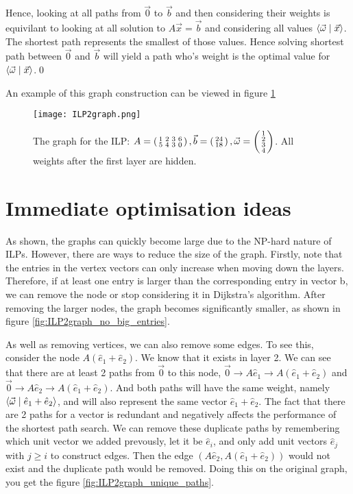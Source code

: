 Hence, looking at all paths from $\vec 0$ to $\vec b$ and then considering their weights is equivilant to looking at all solution to $A\vec x = \vec b$ and considering all values $\langle \vec\omega \mid \vec x \rangle$. The shortest path represents the smallest of those values. Hence solving shortest path between $\vec 0$ and $\vec b$ will yield a path who's weight is the optimal value for $\langle \vec\omega \mid \vec x \rangle$.\qed

An example of this graph construction can be viewed in figure \ref{fig:ILP2graph_no_optimisation}
\begin{figure}
    \texttt{[image: ILP2graph.png]}
    \caption{\label{fig:ILP2graph_no_optimisation}The graph for the ILP: $A = \left(\begin{smallmatrix}1&2&3&6\\5&4&3&0\end{smallmatrix}\right), \vec b = \left(\begin{smallmatrix}24\\18\end{smallmatrix}\right), \vec \omega = \left(\begin{smallmatrix}1\\2\\3\\4\end{smallmatrix}\right)$. All weights after the first layer are hidden.}
\end{figure}

\section{Immediate optimisation ideas}
\label{chap:graph_optimisation}
As shown, the graphs can quickly become large due to the NP-hard nature of ILPs. However, there are ways to reduce the size of the graph. Firstly, note that the entries in the vertex vectors can only increase when moving down the layers. Therefore, if at least one entry is larger than the corresponding entry in vector b, we can remove the node or stop considering it in Dijkstra's algorithm. After removing the larger nodes, the graph becomes significantly smaller, as shown in figure \ref{fig:ILP2graph_no_big_entries}.

As well as removing vertices, we can also remove some edges. To see this, consider the node $A(\hat e_1 + \hat e_2)$. We know that it exists in layer 2. We can see that there are at least 2 paths from $\vec 0$ to this node, $\vec 0 \rightarrow A\hat e_1 \rightarrow A(\hat e_1 + \hat e_2)$ and $\vec 0 \rightarrow A\hat e_2 \rightarrow A(\hat e_1 + \hat e_2)$. And both paths will have the same weight, namely $\langle \vec \omega \mid \hat e_1 + \hat e_2 \rangle$, and will also represent the same vector $\hat e_1 + \hat e_2$. The fact that there are 2 paths for a vector is redundant and negatively affects the performance of the shortest path search. We can remove these duplicate paths by remembering which unit vector we added prevously, let it be $\hat e_i$, and only add unit vectors $\hat e_j$ with $j \geq i$ to construct edges. Then the edge $(A\hat e_2, A(\hat e_1 + \hat e_2))$ would not exist and the duplicate path would be removed. Doing this on the original graph, you get the figure \ref{fig:ILP2graph_unique_paths}.

